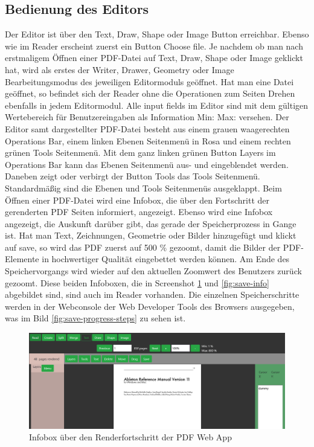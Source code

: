 \subsection{Bedienung des Editors}
Der Editor ist über den Text, Draw, Shape oder Image Button erreichbar. Ebenso wie im Reader erscheint zuerst ein Button Choose file. Je nachdem ob man nach erstmaligem Öffnen einer PDF-Datei auf Text, Draw, Shape oder Image geklickt hat, wird als erstes der Writer, Drawer, Geometry oder Image Bearbeitungsmodus des jeweiligen Editormoduls geöffnet. Hat man eine Datei geöffnet, so befindet sich der Reader ohne die Operationen zum Seiten Drehen ebenfalls in jedem Editormodul. Alle input fields im Editor sind mit dem gültigen Wertebereich für Benutzereingaben als Information Min: Max: versehen. Der Editor samt dargestellter PDF-Datei besteht aus einem grauen waagerechten Operations Bar, einem linken Ebenen Seitenmenü in Rosa und einem rechten grünen Tools Seitenmenü. Mit dem ganz linken grünen Button Layers im Operations Bar kann das Ebenen Seitenmenü aus- und eingeblendet werden. Daneben zeigt oder verbirgt der Button Tools das Tools Seitenmenü. Standardmäßig sind die Ebenen und Tools Seitenmenüs ausgeklappt. Beim Öffnen einer PDF-Datei wird eine Infobox, die über den Fortschritt der gerenderten PDF Seiten informiert, angezeigt. Ebenso wird eine Infobox angezeigt, die Auskunft darüber gibt, das gerade der Speicherprozess in Gange ist. Hat man Text, Zeichnungen, Geometrie oder Bilder hinzugefügt und klickt auf save, so wird das PDF zuerst auf 500 \% gezoomt, damit die Bilder der PDF-Elemente in hochwertiger Qualität eingebettet werden können. Am Ende des Speichervorgangs wird wieder auf den aktuellen Zoomwert des Benutzers zurück gezoomt. Diese beiden Infoboxen, die in Screenshot \ref{fig:render-info} und \ref{fig:save-info} abgebildet sind, sind auch im Reader vorhanden. Die einzelnen Speicherschritte werden in der Webconsole der Web Developer Tools des Browsers ausgegeben, was im Bild \ref{fig:save-progress-steps} zu sehen ist.

\begin{figure}[!htbp]
	\centering
	\includegraphics[width=1\textwidth]{"images/render-info.png"}
	\caption{Infobox über den Renderfortschritt der PDF Web App}
	\label{fig:render-info}
\end{figure}

